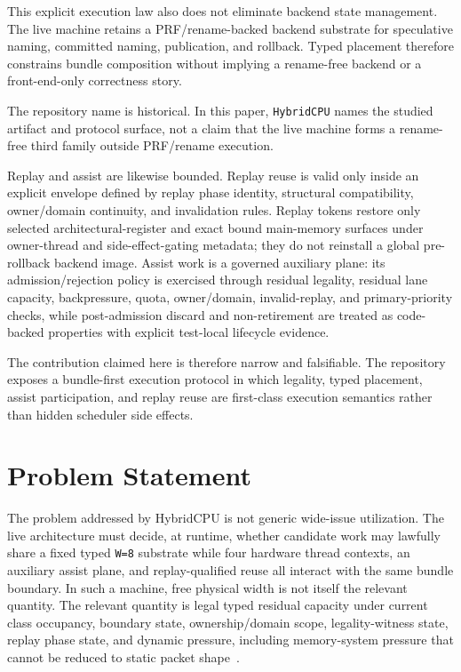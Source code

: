 \documentclass[twocolumn]{article}
\begin{document}
This explicit execution law also does not eliminate backend state management. The live machine retains a PRF/rename-backed backend substrate for speculative naming, committed naming, publication, and rollback. Typed placement therefore constrains bundle composition without implying a rename-free backend or a front-end-only correctness story.

The repository name is historical. In this paper, \texttt{HybridCPU} names the studied artifact and protocol surface, not a claim that the live machine forms a rename-free third family outside PRF/rename execution.

Replay and assist are likewise bounded. Replay reuse is valid only inside an explicit envelope defined by replay phase identity, structural compatibility, owner/domain continuity, and invalidation rules. Replay tokens restore only selected architectural-register and exact bound main-memory surfaces under owner-thread and side-effect-gating metadata; they do not reinstall a global pre-rollback backend image. Assist work is a governed auxiliary plane: its admission/rejection policy is exercised through residual legality, residual lane capacity, backpressure, quota, owner/domain, invalid-replay, and primary-priority checks, while post-admission discard and non-retirement are treated as code-backed properties with explicit test-local lifecycle evidence.

The contribution claimed here is therefore narrow and falsifiable. The repository exposes a bundle-first execution protocol in which legality, typed placement, assist participation, and replay reuse are first-class execution semantics rather than hidden scheduler side effects.


\section{Problem Statement}

The problem addressed by HybridCPU is not generic wide-issue utilization. The live architecture must decide, at runtime, whether candidate work may lawfully share a fixed typed \texttt{W=8} substrate while four hardware thread contexts, an auxiliary assist plane, and replay-qualified reuse all interact with the same bundle boundary. In such a machine, free physical width is not itself the relevant quantity. The relevant quantity is legal typed residual capacity under current class occupancy, boundary state, ownership/domain scope, legality-witness state, replay phase state, and dynamic pressure, including memory-system pressure that cannot be reduced to static packet shape~\cite{mutlu2015memory}.
\end{document}
